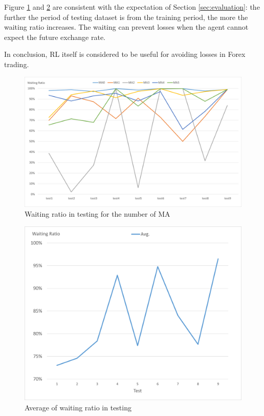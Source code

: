 Figure \ref{fig:waitingTest} and \ref{fig:waitingTestAvg} are consistent with the expectation of Section \ref{sec:evaluation}: the further the period of testing dataset is from the training period, the more the waiting ratio increases. The waiting can prevent losses when the agent cannot expect the future exchange rate.

In conclusion, RL itself is considered to be useful for avoiding losses in Forex trading.

\begin{figure}[htbp]
  \centering
  \includegraphics[scale=0.5]{./Figure/waitingTest.png}
  \caption{Waiting ratio in testing for the number of MA}
  \label{fig:waitingTest}
\end{figure}

\begin{figure}[htbp]
  \centering
  \includegraphics[scale=0.6]{./Figure/waitingTestAvg.png}
  \caption{Average of waiting ratio in testing}
  \label{fig:waitingTestAvg}
\end{figure}
